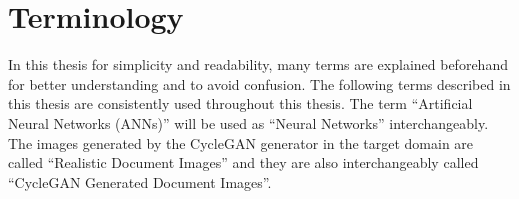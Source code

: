 \section{Terminology}\label{terminology}

In this thesis for simplicity and readability, many terms are explained beforehand for better understanding and to avoid confusion. The following terms described in this thesis are consistently used throughout this thesis. The term ``Artificial Neural Networks (\acp{ANN})'' will be used as ``Neural Networks'' interchangeably. The images generated by the \ac{CycleGAN} generator in the target domain are called ``Realistic Document Images'' and they are also interchangeably called ``\ac{CycleGAN} Generated Document Images''.















